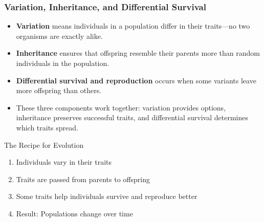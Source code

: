 \documentclass{beamer}
\begin{document}
	\begin{frame}
		\frametitle{Variation, Inheritance, and Differential Survival}
		\begin{itemize}
			\item \textbf{Variation} means individuals in a population differ in their traits—no two organisms are exactly alike.
			\item \textbf{Inheritance} ensures that offspring resemble their parents more than random individuals in the population.
			\item \textbf{Differential survival and reproduction} occurs when some variants leave more offspring than others.
			\item These three components work together: variation provides options, inheritance preserves successful traits, and differential survival determines which traits spread.
		\end{itemize}
		\begin{block}{The Recipe for Evolution}
			\begin{enumerate}
				\item Individuals vary in their traits
				\item Traits are passed from parents to offspring
				\item Some traits help individuals survive and reproduce better
				\item Result: Populations change over time
			\end{enumerate}
		\end{block}
	\end{frame}
	
\end{document}
